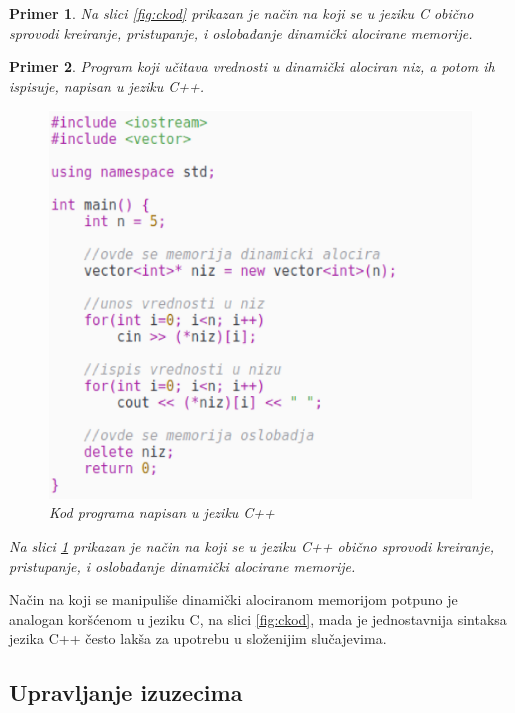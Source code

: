 \documentclass[a4paper]{article}
\newtheorem{primer}{Primer}[section]
\begin{document}
{\begin{primer}
Na slici \ref{fig:ckod} prikazan je način na koji se u jeziku C obično sprovodi kreiranje, pristupanje, i oslobađanje dinamički alocirane memorije. 
\end{primer}

\begin{primer} Program koji učitava vrednosti u dinamički alociran niz, a potom ih ispisuje, napisan u jeziku C++.

\begin{figure}[h!]
\begin{center}
\includegraphics[scale=0.4]{cpp_kod_dinamicka_alokacija.eps}
\end{center}
\caption{Kod programa napisan u jeziku C++}
\label{fig:cppkod}
\end{figure}

Na slici \ref{fig:cppkod} prikazan je način na koji se u jeziku C++ obično sprovodi kreiranje, pristupanje, i oslobađanje dinamički alocirane memorije.
\end{primer}

Način na koji se manipuliše dinamički alociranom memorijom potpuno je analogan koršćenom u jeziku C, na slici \ref{fig:ckod}, mada je jednostavnija sintaksa jezika C++ često lakša za upotrebu u složenijim slučajevima.


\subsection{Upravljanje izuzecima}

}
\end{document}
